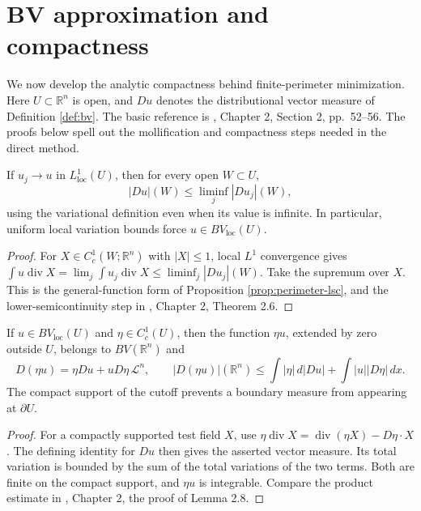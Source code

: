 \chapter{BV approximation and compactness}\label{sec:bv-approximation}
We now develop the analytic compactness behind finite-perimeter minimization. Here $U\subset\mathbb R^n$ is open, and $Du$ denotes the distributional vector measure of Definition \ref{def:bv}. The basic reference is \cite{Sim18}, Chapter 2, Section 2, pp.~52--56. The proofs below spell out the mollification and compactness steps needed in the direct method.

\begin{proposition}\label{prop:bv-lsc}
If $u_j\to u$ in $L^1_{\mathrm{loc}}(U)$, then for every open $W\subset U$,
\[
 |Du|(W)\leq\liminf_j|Du_j|(W),
\]
using the variational definition even when its value is infinite. In particular, uniform local variation bounds force $u\in BV_{\mathrm{loc}}(U)$.
\end{proposition}
\begin{proof}
For $X\in C_c^1(W;\mathbb R^n)$ with $|X|\leq1$, local $L^1$ convergence gives $\int u\operatorname{div}X=\lim_j\int u_j\operatorname{div}X\leq\liminf_j|Du_j|(W)$. Take the supremum over $X$. This is the general-function form of Proposition \ref{prop:perimeter-lsc}, and the lower-semicontinuity step in \cite{Sim18}, Chapter 2, Theorem 2.6.
\end{proof}

\begin{proposition}\label{prop:bv-cutoff-product}
If $u\in BV_{\mathrm{loc}}(U)$ and $\eta\in C_c^1(U)$, then the function $\eta u$, extended by zero outside $U$, belongs to $BV(\mathbb R^n)$ and
\[
 D(\eta u)=\eta Du+uD\eta\,\mathcal L^n,
 \qquad |D(\eta u)|(\mathbb R^n)
 \leq\int|\eta|\,d|Du|+\int|u||D\eta|\,dx.
\]
The compact support of the cutoff prevents a boundary measure from appearing at $\partial U$.
\end{proposition}
\begin{proof}
For a compactly supported test field $X$, use $\eta\operatorname{div}X=\operatorname{div}(\eta X)-D\eta\cdot X$. The defining identity for $Du$ then gives the asserted vector measure. Its total variation is bounded by the sum of the total variations of the two terms. Both are finite on the compact support, and $\eta u$ is integrable. Compare the product estimate in \cite{Sim18}, Chapter 2, the proof of Lemma 2.8.
\end{proof}

